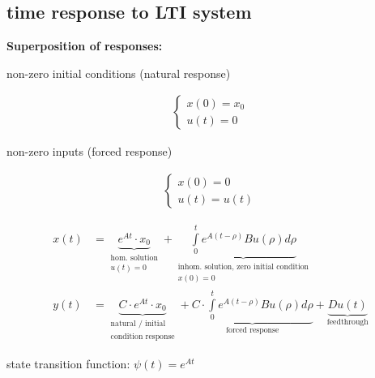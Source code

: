 \subsection{time response to LTI system}
    \begin{center}
        \textbf{Superposition of responses:}
    \end{center}
    
    \begin{minipage}{0.49\linewidth}
        \begin{minipage}{0.49\linewidth}
            non-zero initial conditions (natural response)
        \end{minipage}
        \begin{minipage}{0.49\linewidth}
            \begin{align*}
                \begin{cases}
                    x(0) = x_0\\
                    u(t) = 0
                \end{cases}
            \end{align*}
        \end{minipage}
    \end{minipage}
    \begin{minipage}{0.49\linewidth}
        \begin{minipage}{0.44\linewidth}
            non-zero inputs (forced response)
        \end{minipage}
        \begin{minipage}{0.54\linewidth}
            \begin{align*}
                \begin{cases}
                    x(0) = 0\\
                    u(t) = u(t)
                \end{cases}
            \end{align*}
        \end{minipage}
    \end{minipage}
    \begin{align*}
        x(t) &= \underbrace{e^{At} \cdot x_0}_{\substack{\text{hom. solution}\\ u(t) = 0}} + \underbrace{\int\limits_0^t e^{A (t-\rho)} B u(\rho) d\rho}_{\substack{\text{inhom. solution, zero initial condition}\\ x(0) = 0}}\\
        y(t) &= \underbrace{C \cdot e^{At} \cdot x_0}_{\substack{\text{natural / initial} \\ \text{condition response}}} + \underbrace{C \cdot \int\limits_0^t e^{A (t-\rho)} B u(\rho) d\rho}_{\text{forced response}} + \underbrace{D u(t)}_{\text{feedthrough}}
    \end{align*}

    state transition function: $\psi(t) = e^{At}$